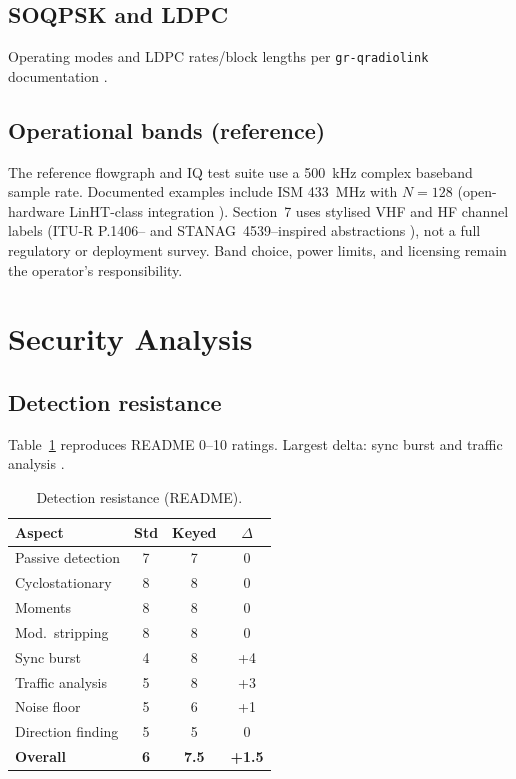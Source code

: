 \documentclass[10pt,a4paper,twocolumn]{article}
\begin{document}
\subsection{SOQPSK and LDPC}
Operating modes and LDPC rates/block lengths per \texttt{gr-qradiolink} documentation \cite{repo_qrl,chung2001}.

\subsection{Operational bands (reference)}
The reference flowgraph and IQ test suite use a 500~kHz complex baseband sample rate. Documented examples include ISM 433~MHz with $N{=}128$ (open-hardware LinHT-class integration \cite{linht_hw}). Section~7 uses stylised VHF and HF channel labels (ITU-R P.1406-- and STANAG~4539--inspired abstractions \cite{itu1406,stanag4539}), not a full regulatory or deployment survey. Band choice, power limits, and licensing remain the operator's responsibility.

\section{Security Analysis}
\subsection{Detection resistance}
Table~\ref{tab:det} reproduces README 0--10 ratings. Largest delta: sync burst and traffic analysis \cite{repo_gdss}.

\begin{table}[H]
\centering
\caption{Detection resistance (README).}
\label{tab:det}
\small
\begin{tabular}{@{}lccc@{}}
\toprule
Aspect & Std & Keyed & $\Delta$ \\
\midrule
Passive detection & 7 & 7 & 0 \\
Cyclostationary & 8 & 8 & 0 \\
Moments & 8 & 8 & 0 \\
Mod.\ stripping & 8 & 8 & 0 \\
Sync burst & 4 & 8 & +4 \\
Traffic analysis & 5 & 8 & +3 \\
Noise floor & 5 & 6 & +1 \\
Direction finding & 5 & 5 & 0 \\
\midrule
\textbf{Overall} & \textbf{6} & \textbf{7.5} & \textbf{+1.5} \\
\bottomrule
\end{tabular}
\end{table}
\end{document}
